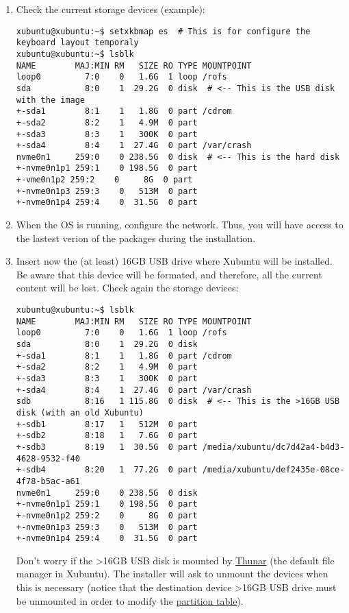 \begin{enumerate}
\item Check the current storage devices (example):

\begin{verbatim}
xubuntu@xubuntu:~$ setxkbmap es  # This is for configure the keyboard layout temporaly
xubuntu@xubuntu:~$ lsblk
NAME        MAJ:MIN RM   SIZE RO TYPE MOUNTPOINT
loop0         7:0    0   1.6G  1 loop /rofs
sda           8:0    1  29.2G  0 disk  # <-- This is the USB disk with the image
+-sda1        8:1    1   1.8G  0 part /cdrom
+-sda2        8:2    1   4.9M  0 part
+-sda3        8:3    1   300K  0 part
+-sda4        8:4    1  27.4G  0 part /var/crash
nvme0n1     259:0    0 238.5G  0 disk  # <-- This is the hard disk
+-nvme0n1p1 259:1    0 198.5G  0 part
+-vme0n1p2 259:2    0     8G  0 part
+-nvme0n1p3 259:3    0   513M  0 part
+-nvme0n1p4 259:4    0  31.5G  0 part
\end{verbatim}
  
\item When the OS is running, configure the network. Thus, you will
  have access to the lastest verion of the packages during the
  installation.
  
\item Insert now the (at least) 16GB USB drive where Xubuntu will be
  installed. Be aware that this device will be formated, and
  therefore, all the current content will be lost. Check again the
  storage devices:

\begin{verbatim}
xubuntu@xubuntu:~$ lsblk
NAME        MAJ:MIN RM   SIZE RO TYPE MOUNTPOINT
loop0         7:0    0   1.6G  1 loop /rofs
sda           8:0    1  29.2G  0 disk
+-sda1        8:1    1   1.8G  0 part /cdrom
+-sda2        8:2    1   4.9M  0 part
+-sda3        8:3    1   300K  0 part
+-sda4        8:4    1  27.4G  0 part /var/crash
sdb           8:16   1 115.8G  0 disk  # <-- This is the >16GB USB disk (with an old Xubuntu)
+-sdb1        8:17   1   512M  0 part
+-sdb2        8:18   1   7.6G  0 part
+-sdb3        8:19   1  30.5G  0 part /media/xubuntu/dc7d42a4-b4d3-4628-9532-f40
+-sdb4        8:20   1  77.2G  0 part /media/xubuntu/def2435e-08ce-4f78-b5ac-a61
nvme0n1     259:0    0 238.5G  0 disk
+-nvme0n1p1 259:1    0 198.5G  0 part
+-nvme0n1p2 259:2    0     8G  0 part
+-nvme0n1p3 259:3    0   513M  0 part
+-nvme0n1p4 259:4    0  31.5G  0 part 
\end{verbatim}

  Don't worry if the >16GB USB disk is mounted by
  \href{https://gitlab.xfce.org/xfce/thunar}{Thunar} (the default file
  manager in Xubuntu). The installer will ask to unmount the devices
  when this is necessary (notice that the destination device >16GB USB
  drive must be unmounted in order to modify the
  \href{https://en.wikipedia.org/wiki/Disk_partitioning}{partition
    table}).
  

\end{enumerate}
